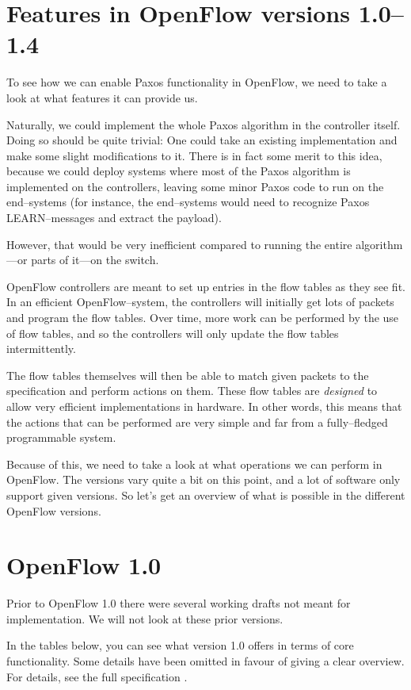 \section{Features in OpenFlow versions 1.0--1.4}

To see how we can enable Paxos functionality in OpenFlow, we need to take a
look at what features it can provide us.

Naturally, we could implement the whole Paxos algorithm in the controller
itself.  Doing so should be quite trivial: One could take an existing
implementation and make some slight modifications to it.  There is in fact
some merit to this idea, because we could deploy systems where most of the
Paxos algorithm is implemented on the controllers, leaving some minor Paxos
code to run on the end--systems (for instance, the end--systems would need
to recognize Paxos LEARN--messages and extract the payload).

However, that would be very inefficient compared to running the entire
algorithm---or parts of it---on the switch.

OpenFlow controllers are meant to set up entries in the flow tables as they
see fit.  In an efficient OpenFlow--system, the
controllers will initially get lots of packets and program the flow tables.
Over time, more work can be performed by the use of flow tables, and so the
controllers will only update the flow tables intermittently.

The flow tables themselves will then be able to match given
packets to the specification and perform actions on them.  These flow tables
are {\em designed} to allow very efficient implementations in hardware.  In
other words, this means that the actions that can be performed are very
simple and far from a fully--fledged programmable system.

Because of this, we need to take a look at what operations we can perform in
OpenFlow.  The versions vary quite a bit on this point, and a lot of
software only support given versions.  So let's get an overview of what is
possible in the different OpenFlow versions.

\section{OpenFlow 1.0}

Prior to OpenFlow 1.0 \cite{openflow-1.0.0} there were several working
drafts not meant for implementation.  We will not look at these prior
versions.

In the tables below, you can see what version 1.0 offers in terms of core
functionality.  Some details have been omitted in favour of giving a clear
overview.  For details, see the full specification \cite{openflow-1.0.0}.


